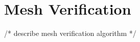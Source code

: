 \appendix   %

\section{Mesh Verification}\label{sec:mverify}


/* describe mesh verification algorithm */

